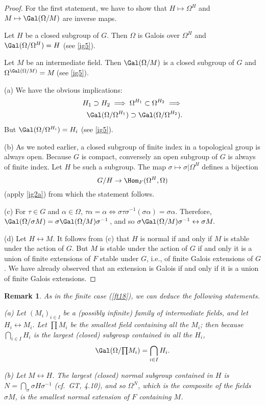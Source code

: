 \documentclass[a4paper,11pt,final,openany]{memoir}
\newtheorem{remark}[X]{Remark}
\theoremstyle{nonumberplain}
\newtheorem{proof}{Proof.}
\begin{document}
\begin{proof}
For the first statement, we have to show that $H\mapsto\Omega^{H}$ and
$M\mapsto\Gal(\Omega/M)$ are inverse maps.

Let $H$ be a closed subgroup of $G$. Then $\Omega$ is Galois over $\Omega^{H}$
and $\Gal(\Omega/\Omega^{H})=H$ (see \ref{ig5}).

Let $M$ be an intermediate field. Then $\Gal(\Omega/M)$ is a closed subgroup
of $G$ and $\Omega^{\Gal(\Omega/M)}=M\,$(see \ref{ig5}).

(a) We have the obvious implications:
\begin{align*}
H_{1}\supset H_{2}\implies\Omega^{H_{1}}\subset\Omega^{H_{2}}\implies\\
\Gal(\Omega/\Omega^{H_{1}})\supset\Gal(\Omega/\Omega^{H_{2}}).
\end{align*}
But $\Gal(\Omega/\Omega^{H_{i}})=H_{i}$ (see \ref{ig5}).

(b) As we noted earlier, a closed subgroup of finite index in a topological
group is always open. Because $G$ is compact, conversely an open subgroup of
$G$ is always of finite index. Let $H$ be such a subgroup. The map
$\sigma\mapsto\sigma|\Omega^{H}$ defines a bijection%
\[
G/H\rightarrow\Hom_{F}(\Omega^{H},\Omega)
\]
(apply \ref{ig2a}) from which the statement follows.

(c) For $\tau\in G$ and $\alpha\in\Omega$, $\tau\alpha=\alpha\iff\sigma
\tau\sigma^{-1}(\sigma\alpha)=\sigma\alpha$. Therefore, $\Gal(\Omega/\sigma
M)=\sigma\Gal(\Omega/M)\sigma^{-1}\,$, and so $\sigma\Gal(\Omega/M)\sigma
^{-1}\leftrightarrow\sigma M.$

(d) Let $H\leftrightarrow M$. It follows from (c) that $H$ is normal if and
only if $M$ is stable under the action of $G$. But $M$ is stable under the
action of $G$ if and only it is a union of finite extensions of $F$ stable
under $G$, i.e., of finite Galois extensions of $G$. We have already observed
that an extension is Galois if and only if it is a union of finite Galois extensions.
\end{proof}

\begin{remark}
\label{ig7}As in the finite case (\ref{ft18}), we can deduce the following statements.

(a) Let $(M_{i})_{i\in I}$ be a (possibly infinite) family of intermediate
fields, and let $H_{i}\leftrightarrow M_{i}$. Let $%
{\textstyle\prod}
M_{i}$ be the smallest field containing all the $M_{i}$; then because
$\bigcap_{i\in I}H_{i}$ is the largest (closed) subgroup contained in all the
$H_{i}$,%
\[
\Gal(\Omega/%
{\textstyle\prod}
M_{i})=\bigcap_{i\in I}H_{i}.
\]


(b) Let $M\leftrightarrow H$. The largest (closed) normal subgroup contained
in $H$ is $N=\bigcap_{\sigma}\sigma H\sigma^{-1}$ (cf.\ GT, 4.10),
and so $\Omega^{N}$, which is the composite of the fields $\sigma M$, is the
smallest normal extension of $F$ containing $M$.
\end{remark}
\end{document}
